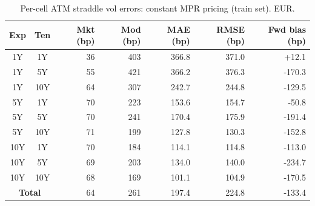 \begin{table}[H]
\centering
\caption{Per-cell ATM straddle vol errors: constant MPR pricing (train set). EUR.}
\label{tab:constant_mpr_marketF0_per_cell_train}
\small
\begin{tabular}{@{}ccrrrrr@{}}
\toprule
\textbf{Exp} & \textbf{Ten} & \textbf{Mkt (bp)} & \textbf{Mod (bp)} & \textbf{MAE (bp)} & \textbf{RMSE (bp)} & \textbf{Fwd bias (bp)} \\
\midrule
  1Y & 1Y & 36 & 403 & 366.8 & 371.0 & +12.1 \\
  1Y & 5Y & 55 & 421 & 366.2 & 376.3 & -170.3 \\
  1Y & 10Y & 64 & 307 & 242.7 & 244.8 & -129.5 \\
  \midrule
  5Y & 1Y & 70 & 223 & 153.6 & 154.7 & -50.8 \\
  5Y & 5Y & 70 & 241 & 170.4 & 175.9 & -191.4 \\
  5Y & 10Y & 71 & 199 & 127.8 & 130.3 & -152.8 \\
  \midrule
  10Y & 1Y & 70 & 184 & 114.1 & 114.8 & -113.0 \\
  10Y & 5Y & 69 & 203 & 134.0 & 140.0 & -234.7 \\
  10Y & 10Y & 68 & 169 & 101.1 & 104.9 & -170.5 \\
  \midrule
  \multicolumn{2}{c}{\textbf{Total}} & 64 & 261 & 197.4 & 224.8 & -133.4 \\
\bottomrule
\end{tabular}
\end{table}